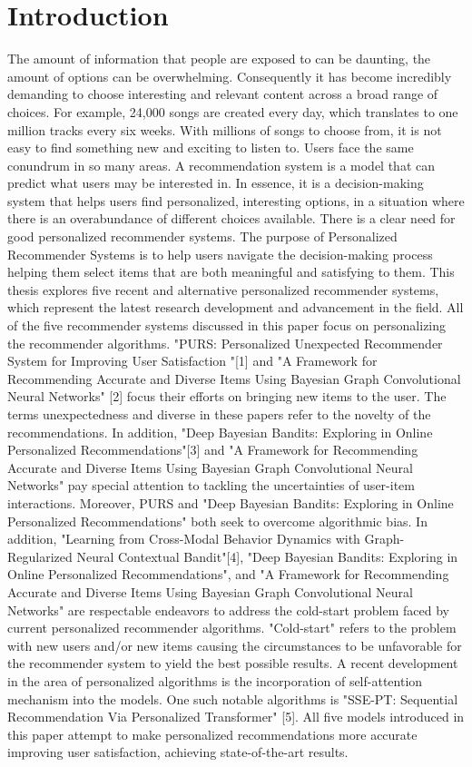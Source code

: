 \chapter{Introduction}

The amount of information that people are exposed to can be daunting, the amount of options can be overwhelming. Consequently it has become incredibly demanding to choose interesting and relevant content across a broad range of choices. For example, 24,000 songs are created every day, which translates to one million tracks every six weeks. With millions of songs to choose from, it is not easy to find something new and exciting to listen to. Users face the same conundrum in so many areas. 
A recommendation system is a model that can predict what users may be interested in. In essence, it is a decision-making system that helps users find personalized, interesting options, in a situation where there is an overabundance of different choices 
available. There is a clear need for good personalized recommender systems. 
The purpose of Personalized Recommender Systems is to help users navigate the  decision-making process helping them select items that are both meaningful and satisfying to them. This thesis explores five recent and alternative personalized recommender systems, which represent the latest research development and advancement in the field.  All of the five recommender systems discussed in this paper focus on personalizing the recommender algorithms. 
"PURS: Personalized Unexpected Recommender System for Improving User Satisfaction "[1] and "A Framework for Recommending Accurate and Diverse Items Using Bayesian Graph Convolutional Neural Networks" [2] focus their efforts on bringing new items to the user. The terms unexpectedness and diverse in these papers refer to the novelty of the recommendations. In addition, "Deep Bayesian Bandits: Exploring in Online Personalized Recommendations"[3] and  "A Framework for Recommending Accurate and Diverse Items Using Bayesian Graph Convolutional Neural Networks" pay special attention to tackling the uncertainties of user-item interactions. Moreover,
PURS and "Deep Bayesian Bandits: Exploring in Online Personalized Recommendations" both seek to overcome algorithmic bias. In addition, "Learning from Cross-Modal Behavior Dynamics with Graph-Regularized Neural Contextual Bandit"[4], "Deep Bayesian Bandits: Exploring in Online Personalized Recommendations", and "A Framework for Recommending Accurate and Diverse Items Using Bayesian Graph Convolutional Neural Networks" are respectable endeavors to address the cold-start problem faced by current personalized recommender algorithms.  "Cold-start" refers to the problem with new users and/or new items causing the circumstances to be unfavorable for the recommender system to yield the best possible results.  A recent development in the area of personalized algorithms is the incorporation of self-attention mechanism into the models. One such notable algorithms is "SSE-PT:
Sequential Recommendation Via Personalized Transformer" [5]. All five models introduced in this paper attempt to make personalized recommendations more accurate improving user satisfaction, achieving state-of-the-art results. 

